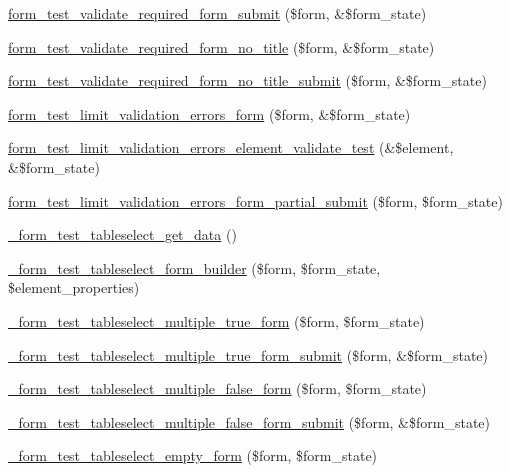 \begin{DoxyCompactItemize}
\item 
\hyperlink{form__test_8module_aa70eaa6503e093b6744817fb5e1aa905}{form\_\-test\_\-validate\_\-required\_\-form\_\-submit} (\$form, \&\$form\_\-state)
\item 
\hyperlink{form__test_8module_a29c8e37557cd20532543c7e72211b3e9}{form\_\-test\_\-validate\_\-required\_\-form\_\-no\_\-title} (\$form, \&\$form\_\-state)
\item 
\hyperlink{form__test_8module_a1893cad2ffe411688e85e59202ac3ac0}{form\_\-test\_\-validate\_\-required\_\-form\_\-no\_\-title\_\-submit} (\$form, \&\$form\_\-state)
\item 
\hyperlink{form__test_8module_acb389949ab5e860b53beb051e4ac7d18}{form\_\-test\_\-limit\_\-validation\_\-errors\_\-form} (\$form, \&\$form\_\-state)
\item 
\hyperlink{form__test_8module_a0105ee13716f1f10af2cc40c7898338f}{form\_\-test\_\-limit\_\-validation\_\-errors\_\-element\_\-validate\_\-test} (\&\$element, \&\$form\_\-state)
\item 
\hyperlink{form__test_8module_a46767cfc135f451875071dcc5d68a309}{form\_\-test\_\-limit\_\-validation\_\-errors\_\-form\_\-partial\_\-submit} (\$form, \$form\_\-state)
\item 
\hyperlink{form__test_8module_a3097de1a18ae18625f8d12dfc40d69cf}{\_\-form\_\-test\_\-tableselect\_\-get\_\-data} ()
\item 
\hyperlink{form__test_8module_a62dc6cc5d63bb5fb45df4f5ae1180420}{\_\-form\_\-test\_\-tableselect\_\-form\_\-builder} (\$form, \$form\_\-state, \$element\_\-properties)
\item 
\hyperlink{form__test_8module_af68698c5c469d6ff31f0cebd729a4f70}{\_\-form\_\-test\_\-tableselect\_\-multiple\_\-true\_\-form} (\$form, \$form\_\-state)
\item 
\hyperlink{form__test_8module_a21ea4f44b6e6d70424454e54d5d6b994}{\_\-form\_\-test\_\-tableselect\_\-multiple\_\-true\_\-form\_\-submit} (\$form, \&\$form\_\-state)
\item 
\hyperlink{form__test_8module_a00d49c26360bc56984b503ba44417d1a}{\_\-form\_\-test\_\-tableselect\_\-multiple\_\-false\_\-form} (\$form, \$form\_\-state)
\item 
\hyperlink{form__test_8module_af5a494be987a2030984aeaa0b8adb731}{\_\-form\_\-test\_\-tableselect\_\-multiple\_\-false\_\-form\_\-submit} (\$form, \&\$form\_\-state)
\item 
\hyperlink{form__test_8module_a6b3af3afe03e6da635cd4a22b97713af}{\_\-form\_\-test\_\-tableselect\_\-empty\_\-form} (\$form, \$form\_\-state)

\end{DoxyCompactItemize}
